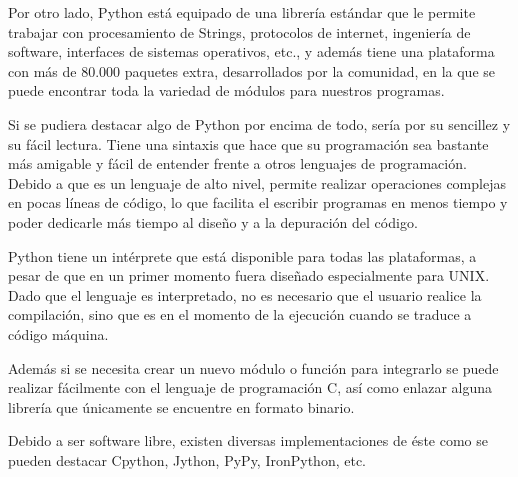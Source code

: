 \documentclass[a4paper, 12pt]{book}
\begin{document}
Por otro lado, Python está equipado de una librería estándar que le permite trabajar con procesamiento de Strings, protocolos de internet, ingeniería de software, interfaces de sistemas operativos, etc., y además tiene una plataforma con más de 80.000 paquetes extra, desarrollados por la comunidad, en la que se puede encontrar toda la variedad de módulos para nuestros programas.

Si se pudiera destacar algo de Python por encima de todo, sería por su sencillez y su fácil lectura. Tiene una sintaxis que hace que su programación sea bastante más amigable y fácil de entender frente a otros lenguajes de programación. Debido a que es un lenguaje de alto nivel, permite realizar operaciones complejas en pocas líneas de código, lo que facilita el escribir programas en menos tiempo y poder dedicarle más tiempo al diseño y a la depuración del código.

Python tiene un intérprete que está disponible para todas las plataformas, a pesar de que en un primer momento fuera diseñado especialmente para UNIX. Dado que el lenguaje es interpretado, no es necesario que el usuario realice la compilación, sino que es en el momento de la ejecución cuando se traduce a código máquina.

Además si se necesita crear un nuevo módulo o función para integrarlo se puede realizar fácilmente con el lenguaje de programación C, así como enlazar alguna librería que únicamente se encuentre en formato binario.

Debido a ser software libre, existen diversas implementaciones de éste como se pueden destacar Cpython, Jython, PyPy, IronPython, etc.
\end{document}
